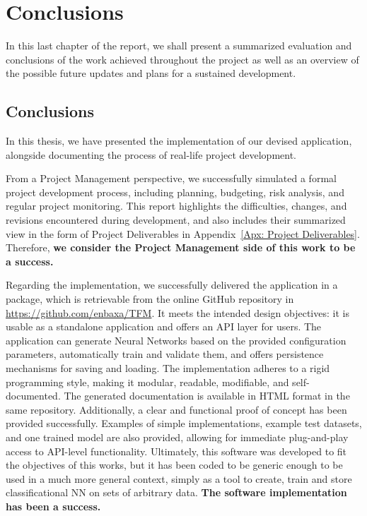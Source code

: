 \documentclass[a4paper, 11pt]{report}
\begin{document}
\chapter{Conclusions}\label{Conclusions}

    In this last chapter of the report, we shall present a summarized evaluation and conclusions of the work achieved throughout the project as well as an overview of the possible future updates and plans for a sustained development.

    \section{Conclusions}
    In this thesis, we have presented the implementation of our devised application, alongside documenting the process of real-life project development.

    From a Project Management perspective, we successfully simulated a formal project development process, including planning, budgeting, risk analysis, and regular project monitoring. This report highlights the difficulties, changes, and revisions encountered during development, and also includes their summarized view in the form of Project Deliverables in Appendix~\ref{Apx: Project Deliverables}. Therefore, \textbf{we consider the Project Management side of this work to be a success.}

    Regarding the implementation, we successfully delivered the application in a package, which is retrievable from the online GitHub repository in \url{https://github.com/enbaxa/TFM}. It meets the intended design objectives: it is usable as a standalone application and offers an API layer for users. The application can generate Neural Networks based on the provided configuration parameters, automatically train and validate them, and offers persistence mechanisms for saving and loading. The implementation adheres to a rigid programming style, making it modular, readable, modifiable, and self-documented. The generated documentation is available in HTML format in the same repository. Additionally, a clear and functional proof of concept has been provided successfully. Examples of simple implementations, example test datasets, and one trained model are also provided, allowing for immediate plug-and-play access to API-level functionality. Ultimately, this software was developed to fit the objectives of this works, but it has been coded to be generic enough to be used in a much more general context, simply as a tool to create, train and store classificational NN on sets of arbitrary data. \textbf{The software implementation has been a success.}
\end{document}
